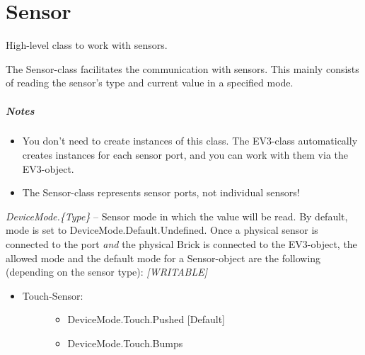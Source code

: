 \documentclass[letterpaper,10pt,english]{sphinxmanual}
\begin{document}
\chapter{Sensor}
\label{source:sensor}

\begin{fulllineitems}
\label{source:source.Sensor}
High-level class to work with sensors.

The Sensor-class facilitates the communication with sensors. This mainly consists of
reading the sensor's type and current value in a specified mode.
\paragraph{Notes}
\begin{itemize}
\item {} 
You don't need to create instances of this class. The EV3-class automatically creates
instances for each sensor port, and you can work with them via the EV3-object.

\item {} 
The Sensor-class represents sensor ports, not individual sensors!

\end{itemize}

\begin{fulllineitems}
\label{source:source.Sensor.mode}
\emph{DeviceMode.\{Type\}} -- Sensor mode in which the value will be read. By default,
mode is set to DeviceMode.Default.Undefined. Once a physical sensor is connected
to the port \emph{and} the physical Brick is connected to the EV3-object, the allowed
mode and the default mode for a Sensor-object are the following (depending on the
sensor type): \emph{{[}WRITABLE{]}}
\begin{itemize}
\item {} \begin{description}
\item[{Touch-Sensor:}] \leavevmode\begin{itemize}
\item {} 
DeviceMode.Touch.Pushed {[}Default{]}

\item {} 
DeviceMode.Touch.Bumps

\end{itemize}


\end{description}
\end{itemize}
\end{fulllineitems}
\end{fulllineitems}
\end{document}
